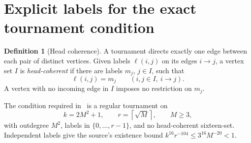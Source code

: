 \documentclass[11pt]{amsart}
\theoremstyle{definition}
\newtheorem{definition}[theorem]{Definition}
\theoremstyle{remark}
\newcommand{\ceil}[1]{\left\lceil#1\right\rceil}
\begin{document}
\section{Explicit labels for the exact tournament condition}
\begin{definition}[Head coherence]\label{def:coherence}
A tournament directs exactly one edge between each pair of distinct vertices.
Given labels $\ell(i,j)$ on its edges $i\to j$, a vertex set $I$ is
\emph{head-coherent} if there are labels $m_j$, $j\in I$, such that
\[
 \ell(i,j)=m_j\qquad(i,j\in I,\ i\to j).
\]
A vertex with no incoming edge in $I$ imposes no restriction on $m_j$.
\end{definition}

The condition required in~\cite[Lemma 2.1]{OpenAI132} is a regular
tournament on
\begin{equation}\label{eq:parameters}
 k=2M^2+1,\qquad r=\ceil{\sqrt M},\qquad M\ge3,
\end{equation}
with outdegree $M^2$, labels in $\{0,\ldots,r-1\}$, and no head-coherent
sixteen-set. Independent labels give the source's existence bound
$k^{16}r^{-104}\le3^{16}M^{-20}<1$.
\end{document}
